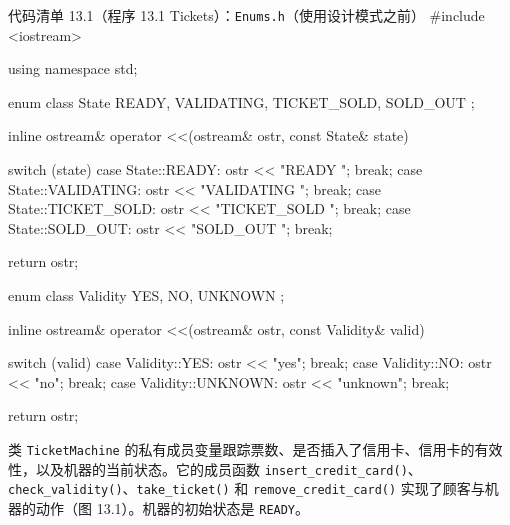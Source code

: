 \begin{codeboxt}{代码清单 13.1（程序 13.1 Tickets）：\texttt{Enums.h}（使用设计模式之前）}
#include <iostream>

using namespace std;

enum class State
{
    READY, VALIDATING, TICKET_SOLD, SOLD_OUT
};

inline ostream& operator <<(ostream& ostr, const State& state)
{
    switch (state)
    {
        case State::READY:       ostr << "READY ";       break;
        case State::VALIDATING:  ostr << "VALIDATING ";  break;
        case State::TICKET_SOLD: ostr << "TICKET_SOLD "; break;
        case State::SOLD_OUT:    ostr << "SOLD_OUT ";    break;
    }

    return ostr;
}

enum class Validity
{
    YES, NO, UNKNOWN
};

inline ostream& operator <<(ostream& ostr, const Validity& valid)
{
    switch (valid)
    {
        case Validity::YES:     ostr << "yes";     break;
        case Validity::NO:      ostr << "no";      break;
        case Validity::UNKNOWN: ostr << "unknown"; break;
    }

    return ostr;
}
\end{codeboxt}

类 \texttt{Ticket\allowbreak{}Machine} 的私有成员变量跟踪票数、是否插入了信用卡、信用卡的有效性，以及机器的当前状态。它的成员函数 \texttt{insert\_\allowbreak{}credit\_\allowbreak{}card(\allowbreak{})\allowbreak{}}、\texttt{check\_\allowbreak{}validity(\allowbreak{})\allowbreak{}}、\texttt{take\_\allowbreak{}ticket(\allowbreak{})\allowbreak{}} 和 \texttt{remove\_\allowbreak{}credit\_\allowbreak{}card(\allowbreak{})\allowbreak{}} 实现了顾客与机器的动作（图 13.1）。机器的初始状态是 \texttt{READY}。

